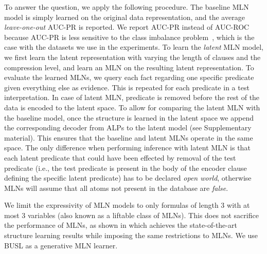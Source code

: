 To answer the question, we apply the following procedure.
The baseline MLN model is simply learned on the original data representation, and the average \textit{leave-one-out} AUC-PR is reported.
We report AUC-PR instead of AUC-ROC because AUC-PR is less sensitive to the class imbalance problem~\cite{Davis:2006:RPR:1143844.1143874}, which is the case with the datasets we use in the experiments.
To learn the \textit{latent} MLN model, we first learn the latent representation with  varying the length of clauses and the compression level, and learn an MLN on the resulting latent representation.
To evaluate the learned MLNs, we query each fact regarding one specific predicate given everything else as evidence.
This is repeated for each predicate in a test interpretation.
In case of latent MLN, predicate is removed before the rest of the data is encoded to the latent space.
To allow for comparing the latent MLN with the baseline model, once the structure is learned in the latent space we append the corresponding decoder from ALPs to the latent model (see Supplementary material).
This ensures that the baseline and latent MLNs operate in the same space.
The only difference when performing inference with latent MLN is that each latent predicate that could have been effected by removal of the test predicate (i.e., the test predicate is present in the body of the encoder clause defining the specific latent predicate) has to be declared \textit{open world}, otherwise MLNs will assume that all atoms not present in the database are \textit{false}.


 We limit the expressivity of MLN models to only formulas of length 3 with at most 3 variables (also known as a liftable class of MLNs).
This does not sacrifice the performance of MLNs, as shown in \cite{VanHaaren2016} which achieves the state-of-the-art structure learning results while imposing the same restrictions to MLNs.
We use BUSL \cite{mihalkova:icml07} as a generative MLN learner.





